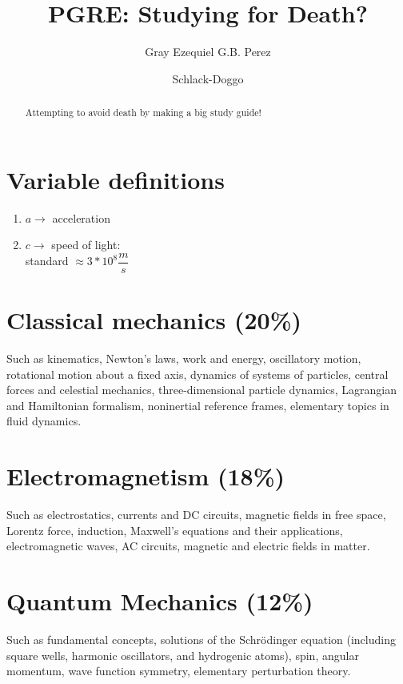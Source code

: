 \documentclass[%
 reprint,
superscriptaddress,
 amsmath,amssymb,
 aps,
prc,
]{revtex4-1}
\begin{document}

\title{PGRE: Studying for Death?}%

\author{Gray Ezequiel G.B. Perez}
\author{Schlack-Doggo}
%

\begin{abstract}
Attempting to avoid death by making a big study guide!
\end{abstract}
\maketitle
\tableofcontents
\section{Variable definitions}
\begin{enumerate}
\item[] $a\rightarrow$ acceleration

\item[] $c\rightarrow$ speed of light:\\
standard  $\approx 3*10^8\dfrac{m}{s}$

\end{enumerate}

\section{Classical mechanics (20\%)}
Such as kinematics, Newton's laws, work and energy, oscillatory motion, rotational motion about a fixed axis, dynamics of systems of particles, central forces and celestial mechanics, three-dimensional particle dynamics, Lagrangian and Hamiltonian formalism, noninertial reference frames, elementary topics in fluid dynamics.

\section{Electromagnetism (18\%)}
Such as electrostatics, currents and DC circuits, magnetic fields in free space, Lorentz force, induction, Maxwell's equations and their applications, electromagnetic waves, AC circuits, magnetic and electric fields in matter.

\section{Quantum Mechanics (12\%)}
Such as fundamental concepts, solutions of the Schrödinger equation (including square wells, harmonic oscillators, and hydrogenic atoms), spin, angular momentum, wave function symmetry, elementary perturbation theory.
\end{document}
